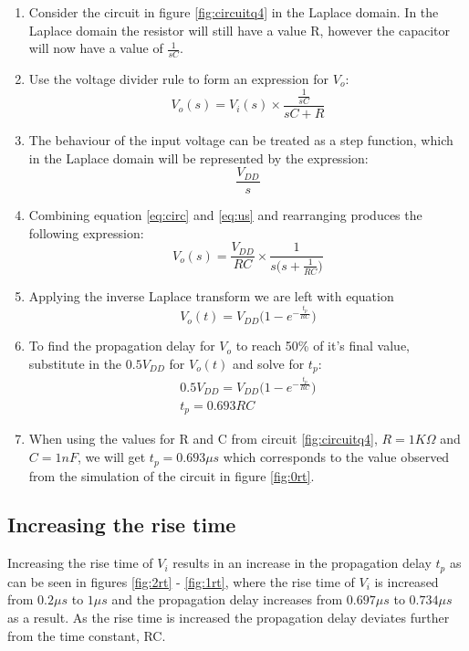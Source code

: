 \documentclass[11pt, a4paper]{article}
\begin{document}
\begin{enumerate}
    \item Consider the circuit in figure \ref{fig:circuitq4} in the Laplace domain. In the Laplace domain the resistor will still have a value R, however the capacitor will now have a value of $\frac{1}{sC}$.
    \item Use the voltage divider rule to form an expression for $V_o$:
        \begin{equation}
            \label{eq:circ}
            V_o(s) = V_i(s) \times \frac{\frac{1}{sC}}{sC + R}
        \end{equation}
    \item The behaviour of the input voltage can be treated as a step function, which in the Laplace domain will be represented by the expression:
    \begin{equation}
        \label{eq:us}
        \frac{V_{DD}}{s}
    \end{equation}
    \item Combining equation \ref{eq:circ} and \ref{eq:us} and rearranging produces the following expression:
    \begin{equation}
        V_o(s) = \frac{V_{DD}}{RC} \times \frac{1}{s\big(s + \frac{1}{RC}\big)}
    \end{equation}
    
    \item Applying the inverse Laplace transform we are left with equation 
    \begin{equation}
        V_{o}(t) = V_{DD} \big( 1 - e^{- \frac{t_p}{RC}} \big)
    \end{equation}
    
    \item To find the propagation delay for $V_o$ to reach 50\% of it's final value, substitute in the $0.5V_{DD}$ for $V_{o}(t)$ and solve for $t_p$:
    \begin{gather}
        0.5V_{DD} = V_{DD} \big( 1 - e^{- \frac{t_p}{RC}} \big)   \\
        t_p = 0.693RC
    \end{gather}
    \item When using the values for R and C from circuit \ref{fig:circuitq4}, $R = 1K\Omega$ and $C = 1nF$, we will get $t_p = 0.693 \mu s$ which corresponds to the value observed from the simulation of the circuit in figure \ref{fig:0rt}.
\end{enumerate}

\subsection{Increasing the rise time}
Increasing the rise time of $V_i$ results in an increase in the propagation delay $t_p$ as can be seen in figures \ref{fig:2rt} - \ref{fig:1rt}, where the rise time of $V_i$ is increased from $0.2 \mu s$  to
$1\mu s$ and the propagation delay increases from $0.697\mu s$ to $0.734\mu s$ as a result. As the rise time is increased the propagation delay deviates further from the time constant, RC.
\end{document}
